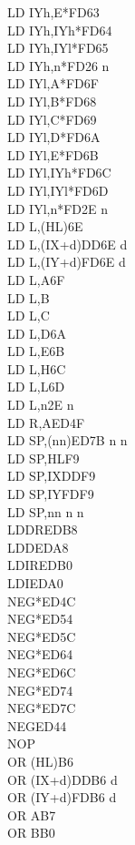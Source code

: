 \documentclass[oneside,a4paper]{book}
\begin{document}
\begin{multicols}{3}
{\begin{tabbing}
LD IYh,E*\>FD63\\
LD IYh,IYh*\>FD64\\
LD IYh,IYl*\>FD65\\
LD IYh,n*\>FD26 n\\
LD IYl,A*\>FD6F\\
LD IYl,B*\>FD68\\
LD IYl,C*\>FD69\\
LD IYl,D*\>FD6A\\
LD IYl,E*\>FD6B\\
LD IYl,IYh*\>FD6C\\
LD IYl,IYl*\>FD6D\\
LD IYl,n*\>FD2E n\\
LD L,(HL)\>6E\\
LD L,(IX+d)\>DD6E d\\
LD L,(IY+d)\>FD6E d\\
LD L,A\>6F\\
LD L,B\\
LD L,C\\
LD L,D\>6A\\
LD L,E\>6B\\
LD L,H\>6C\\
LD L,L\>6D\\
LD L,n\>2E n\\
LD R,A\>ED4F\\
LD SP,(nn)\>ED7B n n\\
LD SP,HL\>F9\\
LD SP,IX\>DDF9\\
LD SP,IY\>FDF9\\
LD SP,nn n n\\
LDDR\>EDB8\\
LDD\>EDA8\\
LDIR\>EDB0\\
LDI\>EDA0\\
NEG*\>ED4C\\
NEG*\>ED54\\
NEG*\>ED5C\\
NEG*\>ED64\\
NEG*\>ED6C\\
NEG*\>ED74\\
NEG*\>ED7C\\
NEG\>ED44\\
NOP\\
OR (HL)\>B6\\
OR (IX+d)\>DDB6 d\\
OR (IY+d)\>FDB6 d\\
OR A\>B7\\
OR B\>B0\\

\end{tabbing}}
\end{multicols}
\end{document}
